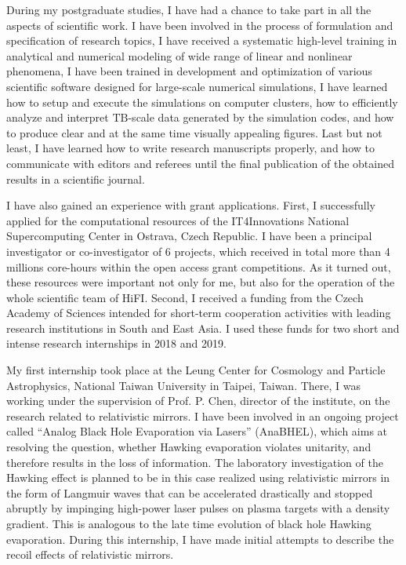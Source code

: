 \documentclass[10pt, a4paper, twoside, openright]{report}
\newcommand{\q}[1]{``#1''} %
\begin{document}


During my postgraduate studies, I have had a chance to take part in all the aspects of scientific work. I have been involved in the process of formulation and specification of research topics, I have received a systematic high-level training in analytical and numerical modeling of wide range of linear and nonlinear phenomena, I have been trained in development and optimization of various scientific software designed for large-scale numerical simulations, I have learned how to setup and execute the simulations on computer clusters, how to efficiently analyze and interpret $ \mathrm{TB} $-scale data generated by the simulation codes, and how to produce clear and at the same time visually appealing figures. Last but not least, I have learned how to write research manuscripts properly, and how to communicate with editors and referees until the final publication of the obtained results in a scientific journal.

I have also gained an experience with grant applications. First, I successfully applied for the computational resources of the IT4Innovations National Supercomputing Center in Ostrava, Czech Republic. I have been a principal investigator or co-investigator of 6 projects, which received in total more than 4 millions core-hours within the open access grant competitions. As it turned out, these resources were important not only for me, but also for the operation of the whole scientific team of HiFI. Second, I received a funding from the Czech Academy of Sciences intended for short-term cooperation activities with leading research institutions in South and East Asia. I used these funds for two short and intense research internships in 2018 and 2019. 

My first internship took place at the Leung Center for Cosmology and Particle Astrophysics, National Taiwan University in Taipei, Taiwan. There, I was working under the supervision of Prof. P. Chen, director of the institute, on the research related to relativistic mirrors. I have been involved in an ongoing project called \q{Analog Black Hole Evaporation via Lasers} (AnaBHEL), which aims at resolving the question, whether Hawking evaporation violates unitarity, and therefore results in the loss of information. The laboratory investigation of the Hawking effect is planned to be in this case realized using relativistic mirrors in the form of Langmuir waves that can be accelerated drastically and stopped abruptly by impinging high-power laser pulses on plasma targets with a density gradient. This is analogous to the late time evolution of black hole Hawking evaporation. During this internship, I have made initial attempts to describe the recoil effects of relativistic mirrors.
\end{document}
